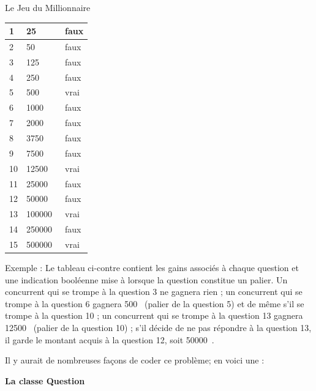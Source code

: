 \begin{Exercice}{Le Jeu du Millionnaire}
	\begin{minipage}[t][][b]{2.5cm}
	\begin{center}
	\begin{footnotesize}
	\begin{tabular}{|l|l|l|}\hline
	  1 &      25~\texteuro & faux \\\hline
	  2 &      50~\texteuro & faux \\\hline
	  3 &     125~\texteuro & faux \\\hline
	  4 &     250~\texteuro & faux \\\hline
	  5 &     500~\texteuro & vrai \\\hline
	  6 &    1000~\texteuro & faux \\\hline
	  7 &    2000~\texteuro & faux \\\hline
	  8 &    3750~\texteuro & faux \\\hline
	  9 &    7500~\texteuro & faux \\\hline
	 10 &   12500~\texteuro & vrai \\\hline
	 11 &   25000~\texteuro & faux \\\hline
	 12 &   50000~\texteuro & faux \\\hline
	 13 &  100000~\texteuro & vrai \\\hline
	 14 &  250000~\texteuro & faux \\\hline
	 15 &  500000~\texteuro & vrai \\\hline
	\end{tabular}
	\end{footnotesize}
	\end{center}
	\end{minipage}%
	\hfill
	\begin{minipage}[t][][b]{10cm}
	Exemple : Le tableau ci-contre contient les gains associés à chaque 
	question et une indication booléenne mise à
	 lorsque la question
	constitue un palier. Un concurrent qui se
	trompe à la question 3 ne gagnera rien ; un concurrent qui se trompe à
	la question 6 gagnera 500~\texteuro{} (palier de la question 5) et de même s’il
	se trompe à la question 10 ; un concurrent qui se trompe à la question
	13 gagnera 12500~\texteuro{} (palier de la question 10) ; 
	s'il décide de ne pas répondre à la question 13,
	il garde le montant acquis à la question 12, soit 50000~\texteuro.
	\end{minipage}
	
	Il y aurait de nombreuses façons de coder ce problème; en voici une :

	{\bfseries La classe Question}


\end{Exercice}
